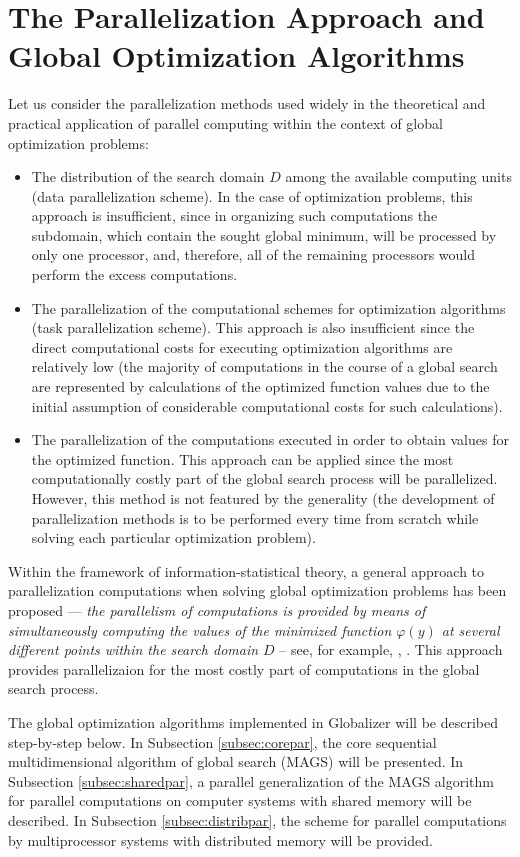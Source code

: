 \documentclass{gOMS2e}
\theoremstyle{plain}%
\theoremstyle{definition}
\theoremstyle{remark}
\begin{document}
\section{The Parallelization Approach and Global Optimization Algorithms}
\label{sec:parallel}
Let us consider the parallelization methods used widely in the theoretical and
practical application of parallel computing within the context of global optimization problems:
\begin{itemize}
  \item The distribution of the search domain \(D\) among the available computing units
  (data parallelization scheme). In the case of optimization problems, this approach is
  insufficient, since in organizing such computations the subdomain, which contain the
  sought global minimum, will be processed by only one processor, and, therefore,
  all of the remaining processors would perform the excess computations.
  \item The parallelization of the computational schemes for optimization algorithms
  (task parallelization scheme). This approach is also insufficient since the direct
  computational costs for executing optimization algorithms are relatively low
  (the majority of computations in the course of a global search are represented by
  calculations of the optimized function values due to the initial assumption of
  considerable computational costs for such calculations).
  \item The parallelization of the computations executed in order to obtain values
  for the optimized function. This approach can be applied since the most computationally
  costly part of the global search process will be parallelized. However, this method is not
  featured by the generality (the development of parallelization methods is to be performed
  every time from scratch while solving each particular optimization problem).
\end{itemize}
\par
Within the framework of information-statistical theory, a general approach to
parallelization computations when solving global optimization problems has been
proposed --- \textit{the parallelism of computations is provided by means of simultaneously
computing the values of the minimized function \(\varphi(y)\) at several different
points within the search domain \(D\)} – see, for example, \cite{strSergGO}, \cite{stronginGergelBarkalovParGO}.
This approach provides parallelizaion for the most costly part of computations in the global search process.
\par
The global optimization algorithms implemented in Globalizer will be described step-by-step below.
In Subsection \ref{subsec:corepar}, the core sequential multidimensional algorithm of global search (MAGS) will be presented.
In Subsection \ref{subsec:sharedpar}, a parallel generalization of the MAGS algorithm for parallel computations on
computer systems with shared memory will be described. In Subsection \ref{subsec:distribpar}, the scheme
for parallel computations by multiprocessor systems with distributed memory will be provided.
\end{document}
